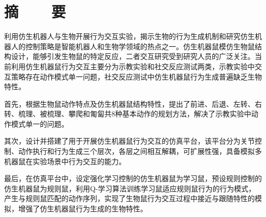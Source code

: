 %
%
%
%
%

\topskip=0pt

\vspace*{-7mm}

\begin{center}
  \heiti{}\textbf{\thesisTitle}
\end{center}

\vspace*{2mm}

{\let\clearpage\relax \chapter*{\textmd{摘~~~~要}}}
\setcounter{page}{1}

\vspace*{1mm}

\setlength{\parskip}{0em}

利用仿生机器人与生物开展行为交互实验，揭示生物的行为生成机制和研究仿生机器人的控制策略是智能机器人和生物学领域的热点之一。仿生机器鼠模仿生物鼠结构设计，能够引发生物鼠的特定反应，二者交互研究受到研究人员的广泛关注。当前利用仿生机器鼠行为交互主要分为示教实验和社交反应测试两类，示教实验中交互策略存在动作模式单一问题，社交反应测试中仿生机器鼠行为生成普遍缺乏生物特性。

首先，根据生物鼠动作特点及仿生机器鼠结构特性，提出了前进、后退、左转、右转、梳理、被梳理、攀爬和匍匐共8种基本动作的规划方法，解决了示教实验中动作模式单一的问题。

其次，设计并搭建了用于开展仿生机器鼠行为交互的仿真平台，该平台分为关节控制、动作执行和行为生成三个层次，各层之间相互解耦，可扩展性强，具备模拟多机器鼠在实验场景中行为交互的能力。

最后，在仿真平台中，设定强化学习控制的仿生机器鼠为学习鼠，预设规则控制的仿生机器鼠为规则鼠，利用Q-学习算法训练学习鼠适应规则鼠行为的行为模式，产生与规则鼠匹配的动作序列，实现了生物鼠行为交互过程中接近与跟随特性的模拟，增强了仿生机器鼠行为生成的生物特性。

